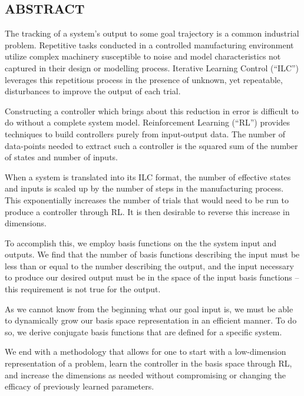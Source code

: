 \pagestyle{plain}
\begin{center}


\section*{ABSTRACT}


\end{center}
The tracking of a system's output to some goal trajectory is a common industrial problem. Repetitive tasks conducted in a controlled manufacturing environment utilize complex machinery susceptible to noise and model characteristics not captured in their design or modelling process. Iterative Learning Control (``ILC'') leverages this repetitious process in the presence of unknown, yet repeatable, disturbances to improve the output of each trial.

Constructing a controller which brings about this reduction in error is difficult to do without a complete system model. Reinforcement Learning (``RL'') provides techniques to build controllers purely from input-output data. The number of data-points needed to extract such a controller is the squared sum of the number of states and number of inputs.

When a system is translated into its ILC format, the number of effective states and inputs is scaled up by the number of steps in the manufacturing process. This exponentially increases the number of trials that would need to be run to produce a controller through RL. It is then desirable to reverse this increase in dimensions.

To accomplish this, we employ basis functions on the the system input and outputs. We find that the number of basis functions describing the input must be less than or equal to the number describing the output, and the input necessary to produce our desired output must be in the space of the input basis functions -- this requirement is not true for the output.

As we cannot know from the beginning what our goal input is, we must be able to dynamically grow our basis space representation in an efficient manner. To do so, we derive conjugate basis functions that are defined for a specific system.

We end with a methodology that allows for one to start with a low-dimension representation of a problem, learn the controller in the basis space through RL, and increase the dimensions as needed without compromising or changing the efficacy of previously learned parameters.

\cleardoublepage%